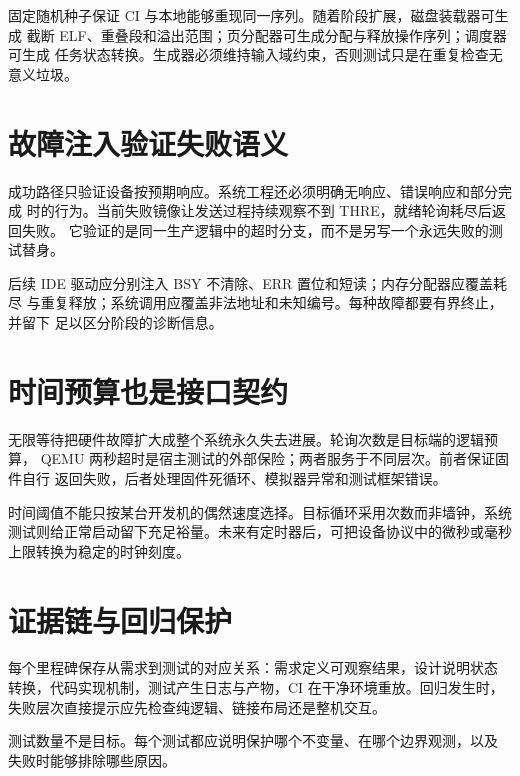 固定随机种子保证 CI 与本地能够重现同一序列。随着阶段扩展，磁盘装载器可生成
截断 ELF、重叠段和溢出范围；页分配器可生成分配与释放操作序列；调度器可生成
任务状态转换。生成器必须维持输入域约束，否则测试只是在重复检查无意义垃圾。

\section{故障注入验证失败语义}

成功路径只验证设备按预期响应。系统工程还必须明确无响应、错误响应和部分完成
时的行为。当前失败镜像让发送过程持续观察不到 THRE，就绪轮询耗尽后返回失败。
它验证的是同一生产逻辑中的超时分支，而不是另写一个永远失败的测试替身。

后续 IDE 驱动应分别注入 BSY 不清除、ERR 置位和短读；内存分配器应覆盖耗尽
与重复释放；系统调用应覆盖非法地址和未知编号。每种故障都要有界终止，并留下
足以区分阶段的诊断信息。

\section{时间预算也是接口契约}

无限等待把硬件故障扩大成整个系统永久失去进展。轮询次数是目标端的逻辑预算，
QEMU 两秒超时是宿主测试的外部保险；两者服务于不同层次。前者保证固件自行
返回失败，后者处理固件死循环、模拟器异常和测试框架错误。

时间阈值不能只按某台开发机的偶然速度选择。目标循环采用次数而非墙钟，系统
测试则给正常启动留下充足裕量。未来有定时器后，可把设备协议中的微秒或毫秒
上限转换为稳定的时钟刻度。

\section{证据链与回归保护}

每个里程碑保存从需求到测试的对应关系：需求定义可观察结果，设计说明状态
转换，代码实现机制，测试产生日志与产物，CI 在干净环境重放。回归发生时，
失败层次直接提示应先检查纯逻辑、链接布局还是整机交互。

\begin{keyidea}
测试数量不是目标。每个测试都应说明保护哪个不变量、在哪个边界观测，以及
失败时能够排除哪些原因。
\end{keyidea}
